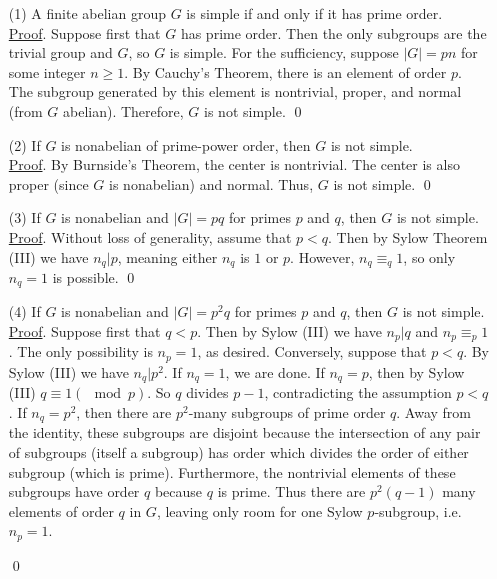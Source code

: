 \documentclass[11pt]{amsart}
\theoremstyle{definition}
\renewenvironment{proof}{\underline{Proof}.}{\qed}
\renewcommand\geq{\geqslant}
\renewcommand\:{\colon}
\newcommand{\1}{\mathds{1}}
\begin{document}
\begin{enumerate}[leftmargin=*]\setlength\itemsep{5pt}
\item[(1)] A finite abelian group $G$ is simple if and only if it has prime order. \\
\begin{proof}
	Suppose first that $G$ has prime order. Then the only subgroups are the trivial group and $G$, so $G$ is simple. For the sufficiency, suppose $|G| = pn$ for some integer $n \geq 1$. By Cauchy's Theorem, there is an element of order $p$. The subgroup generated by this element is nontrivial, proper, and normal (from $G$ abelian). Therefore, $G$ is not simple.
\end{proof}
\item[(2)] If $G $ is nonabelian of prime-power order, then $G$ is not simple. \\
\begin{proof}
	By Burnside's Theorem, the center is nontrivial. The center is also proper (since $G$ is nonabelian) and normal. Thus, $G$ is not simple.
\end{proof}
\item[(3)] If $G$ is nonabelian and $|G| = pq$ for primes $p$ and $q$, then $G$ is not simple. \\
\begin{proof}
	Without loss of generality, assume that $p < q$. Then by Sylow Theorem (III) we have $n_q|p$, meaning either $n_q$ is $1$ or $p$. However, $n_q \equiv_q 1$, so only $n_q = 1$ is possible. 
\end{proof}
\item[(4)] If $G$ is nonabelian and $|G| = p^2q$ for primes $p$ and $q$, then $G$ is not simple. \\
\begin{proof}
	Suppose first that $q < p$. Then by Sylow (III) we have $n_p|q$ and $n_p \equiv_p 1$. The only possibility is $n_p = 1$, as desired.  Conversely, suppose that $p < q$. By Sylow (III) we have $n_q|p^2$. If $n_q = 1$, we are done. If $n_q = p$, then by Sylow (III) $q \equiv 1 (\mod p)$. So $q$ divides $p-1$, contradicting the assumption $p < q$. If $n_q = p^2$, then there are $p^2$-many subgroups of prime order $q$. Away from the identity, these subgroups are disjoint because the intersection of any pair of subgroups (itself a subgroup) has order which divides the order of either subgroup (which is prime). Furthermore, the nontrivial elements of these subgroups have order $q$ because $q$ is prime. Thus there are $p^2(q - 1)$ many elements of order $q$ in $G$, leaving only room for one Sylow $p$-subgroup, i.e. $n_p = 1$.

\end{proof}
\end{enumerate}
\end{document}
